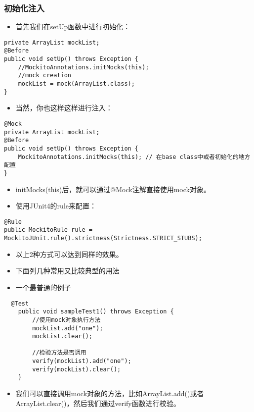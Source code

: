 \documentclass[9pt, b5paper]{article}
\begin{document}
\subsubsection{初始化注入}
\label{sec-1-1-1}
\begin{itemize}
\item 首先我们在setUp函数中进行初始化：
\end{itemize}
\begin{verbatim}
private ArrayList mockList;
@Before
public void setUp() throws Exception {
    //MockitoAnnotations.initMocks(this);
    //mock creation
    mockList = mock(ArrayList.class);
}
\end{verbatim}
\begin{itemize}
\item 当然，你也这样这样进行注入：
\end{itemize}
\begin{verbatim}
@Mock
private ArrayList mockList;
@Before
public void setUp() throws Exception {
    MockitoAnnotations.initMocks(this); // 在base class中或者初始化的地方配置
}
\end{verbatim}
\begin{itemize}
\item initMocks(this)后，就可以通过@Mock注解直接使用mock对象。
\item 使用JUnit4的rule来配置：
\end{itemize}
\begin{verbatim}
@Rule
public MockitoRule rule = MockitoJUnit.rule().strictness(Strictness.STRICT_STUBS);
\end{verbatim}
\begin{itemize}
\item 以上2种方式可以达到同样的效果。

\item 下面列几种常用又比较典型的用法
\item 一个最普通的例子
\end{itemize}
\begin{verbatim}
  @Test
    public void sampleTest1() throws Exception {
        //使用mock对象执行方法
        mockList.add("one");
        mockList.clear();

        //检验方法是否调用
        verify(mockList).add("one");   
        verify(mockList).clear();     
    }
\end{verbatim}
\begin{itemize}
\item 我们可以直接调用mock对象的方法，比如ArrayList.add()或者ArrayList.clear()，然后我们通过verify函数进行校验。
\end{itemize}
\end{document}
